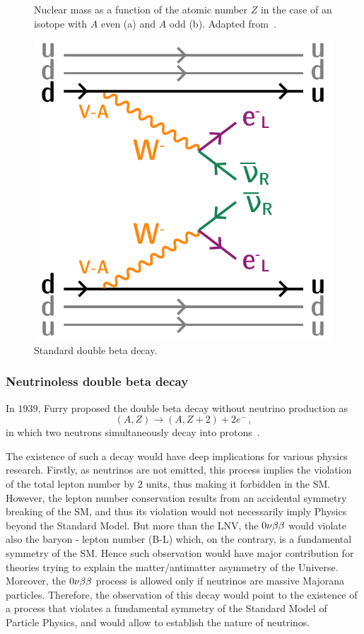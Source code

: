 \begin{figure}[h]
\begin{subfigure}[t]{0.48\textwidth}
    \captionsetup{justification=justified}
    \caption{
      \label{subfig:}}
  \end{subfigure}
  \caption{Nuclear mass as a function of the atomic number $Z$ in the case of an isotope with $A$ even (a) and $A$ odd (b).
    Adapted from~\cite{art:delloro_2015}.
    \label{fig:2nu_even_odd}
  }
\end{figure}

\begin{figure}[h!]
  \centering
    \includegraphics[height=0.4\textwidth]{neutrinophysics/fig_neutrinophysics/2nubb_diagram.pdf}
  \caption{Standard double beta decay.
    \label{fig:2nu_diagram}}
\end{figure}


\subsubsection*{Neutrinoless double beta decay}

In $1939$, Furry proposed the double beta decay without neutrino production as
\begin{equation}
(A,Z)\rightarrow (A,Z+2)+2e^{-}\,,
\end{equation}
in which two neutrons simultaneously decay into protons~\cite{art:furry_1939}.

The existence of such a decay would have deep implications for various physics research.
Firstly, as neutrinos are not emitted, this process implies the violation of the total lepton number by $2$ units, thus making it forbidden in the SM.
However, the lepton number conservation results from an accidental symmetry breaking of the SM, and thus its violation would not necessarily imply Physics beyond the Standard Model.
But more than the LNV, the $0\nu\beta\beta$ would violate also the baryon - lepton number (B-L) which, on the contrary, is a fundamental symmetry of the SM.
Hence such observation would have major contribution for theories trying to explain the matter/antimatter asymmetry of the Universe.
Moreover, the $0\nu\beta\beta$ process is allowed only if neutrinos are massive Majorana particles.
Therefore, the observation of this decay would point to the existence of a process that violates a fundamental symmetry of the Standard Model of Particle Physics, and would allow to establish the nature of neutrinos.

